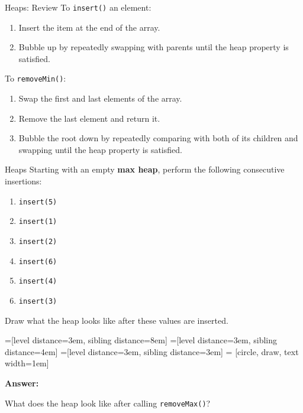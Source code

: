 \documentclass[9pt]{beamer}
\begin{document}
\begin{frame}[fragile]{Heaps: Review}
  To {\tt insert()} an element:
  \begin{enumerate}
    \item
      Insert the item at the end of the array.
    \item
      Bubble up by repeatedly swapping with parents until the heap property
      is satisfied.
  \end{enumerate}

  \vspace{2em}

  \pause
  To {\tt removeMin()}:
  \begin{enumerate}
    \item
      Swap the first and last elements of the array.
    \item
      Remove the last element and return it.
    \item
      Bubble the root down by repeatedly comparing with both of its children
      and swapping until the heap property is satisfied.
  \end{enumerate}
\end{frame}

\begin{frame}[fragile]{Heaps}
  Starting with an empty {\bf max heap}, perform the following consecutive insertions:
  \begin{enumerate}
    \item
      {\tt insert(5)}
    \item
      {\tt insert(1)}
    \item
      {\tt insert(2)}
    \item
      {\tt insert(6)}
    \item
      {\tt insert(4)}
    \item
      {\tt insert(3)}
  \end{enumerate}

  Draw what the heap looks like after these values are inserted.

  =[level distance=3em, sibling distance=8em]
  =[level distance=3em, sibling distance=4em]
  =[level distance=3em, sibling distance=3em]
   = [circle, draw, text width=1em]

  \pause
  {\bf Answer:}


  \pause
  What does the heap look like after calling {\tt removeMax()}?
\end{frame}
\end{document}
